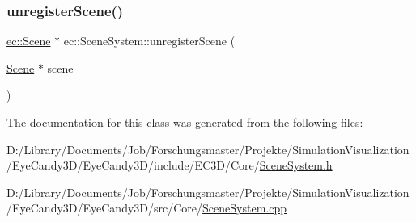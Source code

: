 \mbox{\label{classec_1_1_scene_system_ae00450951bc3220dd9899d75bdd207c4}} 
\subsubsection{\texorpdfstring{unregister\+Scene()}{unregisterScene()}}
{\footnotesize\ttfamily \mbox{\hyperlink{classec_1_1_scene}{ec\+::\+Scene}} $\ast$ ec\+::\+Scene\+System\+::unregister\+Scene (\begin{DoxyParamCaption}\item[{\mbox{\hyperlink{classec_1_1_scene}{Scene}} $\ast$}]{scene }\end{DoxyParamCaption})}



The documentation for this class was generated from the following files\+:\begin{DoxyCompactItemize}
\item 
D\+:/\+Library/\+Documents/\+Job/\+Forschungsmaster/\+Projekte/\+Simulation\+Visualization/\+Eye\+Candy3\+D/\+Eye\+Candy3\+D/include/\+E\+C3\+D/\+Core/\mbox{\hyperlink{_scene_system_8h}{Scene\+System.\+h}}\item 
D\+:/\+Library/\+Documents/\+Job/\+Forschungsmaster/\+Projekte/\+Simulation\+Visualization/\+Eye\+Candy3\+D/\+Eye\+Candy3\+D/src/\+Core/\mbox{\hyperlink{_scene_system_8cpp}{Scene\+System.\+cpp}}\end{DoxyCompactItemize}
